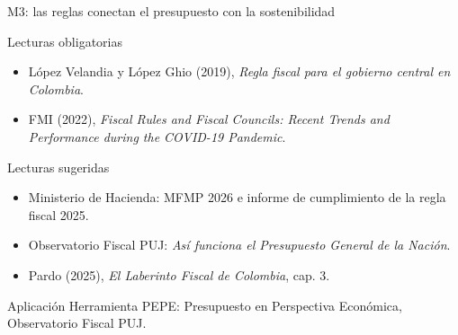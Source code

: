\documentclass{beamer}
\begin{document}
\begin{frame}{M3: las reglas conectan el presupuesto con la sostenibilidad}
\footnotesize
\begin{block}{Lecturas obligatorias}
  \begin{itemize}
    \item L\'opez Velandia y L\'opez Ghio (2019), \textit{Regla fiscal para el gobierno central en Colombia}.
    \item FMI (2022), \textit{Fiscal Rules and Fiscal Councils: Recent Trends and Performance during the COVID-19 Pandemic}.
  \end{itemize}
\end{block}
\begin{block}{Lecturas sugeridas}
  \begin{itemize}
    \item Ministerio de Hacienda: MFMP 2026 e informe de cumplimiento de la regla fiscal 2025.
    \item Observatorio Fiscal PUJ: \textit{As\'i funciona el Presupuesto General de la Naci\'on}.
    \item Pardo (2025), \textit{El Laberinto Fiscal de Colombia}, cap. 3.
  \end{itemize}
\end{block}
\begin{alertblock}{Aplicaci\'on}
Herramienta PEPE: Presupuesto en Perspectiva Econ\'omica, Observatorio Fiscal PUJ.
\end{alertblock}
\end{frame}
\end{document}
